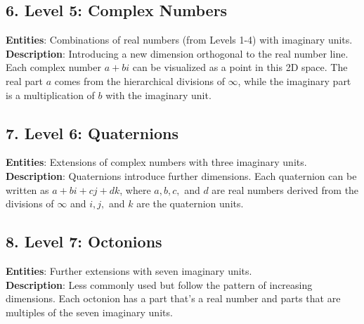 \documentclass{article}
\begin{document}
\subsection*{6. Level 5: Complex Numbers}
\textbf{Entities}: Combinations of real numbers (from Levels 1-4) with imaginary units. \\
\textbf{Description}: Introducing a new dimension orthogonal to the real number line. Each complex number $a + bi$ can be visualized as a point in this 2D space. The real part $a$ comes from the hierarchical divisions of $\infty$, while the imaginary part is a multiplication of $b$ with the imaginary unit.

\subsection*{7. Level 6: Quaternions}
\textbf{Entities}: Extensions of complex numbers with three imaginary units. \\
\textbf{Description}: Quaternions introduce further dimensions. Each quaternion can be written as $a + bi + cj + dk$, where $a, b, c,$ and $d$ are real numbers derived from the divisions of $\infty$ and $i, j,$ and $k$ are the quaternion units.

\subsection*{8. Level 7: Octonions}
\textbf{Entities}: Further extensions with seven imaginary units. \\
\textbf{Description}: Less commonly used but follow the pattern of increasing dimensions. Each octonion has a part that's a real number and parts that are multiples of the seven imaginary units.
\end{document}
